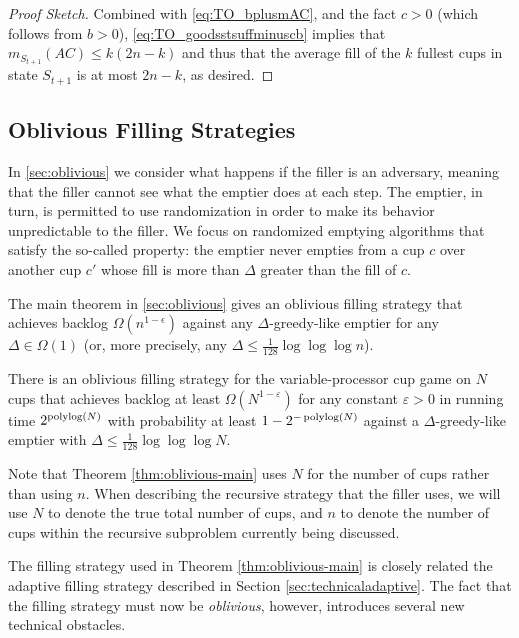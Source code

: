 \begin{proof}[Proof Sketch]
Combined with \eqref{eq:TO_bplusmAC}, and the fact $c>0$ (which
follows from $b > 0$), \eqref{eq:TO_goodsstsuffminuscb} implies
that $m_{S_{t + 1}}(AC) \le k(2n - k)$ and thus that the average
fill of the $k$ fullest cups in state $S_{t+1}$ is at most
$2n-k$, as desired.
\end{proof}

\subsection{Oblivious Filling Strategies}

In \cref{sec:oblivious} we consider what happens if the filler is an
 adversary, meaning that the filler cannot see what
the emptier does at each step. The emptier, in turn, is permitted to
use randomization in order to make its behavior unpredictable to the
filler. We focus on randomized emptying algorithms that satisfy the
so-called  property: the emptier never
empties from a cup $c$ over another cup $c'$ whose fill is more than
$\Delta$ greater than the fill of $c$.

The main theorem in \cref{sec:oblivious} gives an oblivious filling
strategy that achieves backlog $\Omega(n^{1 - \epsilon})$ against any
$\Delta$-greedy-like emptier for any $\Delta \in \Omega(1)$ (or, more
precisely, any $\Delta \le \frac{1}{128} \log \log \log n$).

\begin{theorem}
  There is an oblivious filling strategy for the
  variable-processor cup game on $N$ cups that achieves backlog
  at least $\Omega(N^{1-\varepsilon})$ for any constant $\varepsilon
  >0$ in running time $2^{\operatorname{\textnormal{polylog}}(N)}$ with probability at least
  $1-2^{-\operatorname{\textnormal{polylog}}(N)}$ against a $\Delta$-greedy-like emptier
  with $\Delta \le \frac{1}{128} \log\log\log N$.
  \label{thm:oblivious-main}
\end{theorem}

Note that Theorem \ref{thm:oblivious-main} uses $N$ for the number of
cups rather than using $n$. When describing the recursive strategy
that the filler uses, we will use $N$ to denote the true total number
of cups, and $n$ to denote the number of cups within the recursive
subproblem currently being discussed.

The filling strategy used in Theorem \ref{thm:oblivious-main} is
closely related the adaptive filling strategy described in Section
\ref{sec:technicaladaptive}. The fact that the filling strategy must
now be \emph{oblivious}, however, introduces several new technical
obstacles.

